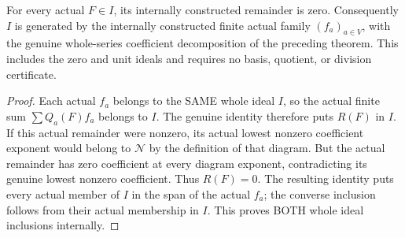 \begin{theorem}
\label{hir:actual-formal-vertex-series-whole-ideal-generation}
For every actual $F\in I$, its internally constructed remainder is zero.
Consequently $I$ is generated by the internally constructed finite actual
family $(f_a)_{a\in V}$, with the genuine whole-series coefficient
decomposition of the preceding theorem. This includes the zero and unit
ideals and requires no basis, quotient, or division certificate.
\leanok
\end{theorem}
\begin{proof}
Each actual $f_a$ belongs to the SAME whole ideal $I$, so the actual finite
sum $\sum Q_a(F)f_a$ belongs to $I$. The genuine identity therefore
puts $R(F)$ in $I$. If this actual remainder were nonzero, its actual
lowest nonzero coefficient exponent would belong to $\mathcal N$
by the definition of that diagram. But the actual remainder has zero
coefficient at every diagram exponent, contradicting its genuine
lowest nonzero coefficient. Thus $R(F)=0$. The resulting identity puts
every actual member of $I$ in the span of the actual $f_a$; the converse
inclusion follows from their actual membership in $I$. This proves BOTH
whole ideal inclusions internally.
\end{proof}
